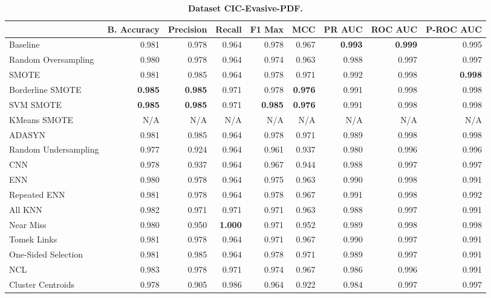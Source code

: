\begin{table}[H]
    \centering
    \setlength\tabcolsep{2pt}
    \begin{tabularx}{\textwidth}{lRRRRRRRR}
        & B. Accuracy & Precision & Recall & F1 Max & MCC & PR AUC & ROC AUC & P-ROC AUC \\
        \midrule
        Baseline & 0.981 & 0.978 & 0.964 & 0.978 & 0.967 & \textbf{0.993} & \textbf{0.999} & 0.995 \\
        Random Oversampling & 0.980 & 0.978 & 0.964 & 0.974 & 0.963 & 0.988 & 0.997 & 0.997 \\
        SMOTE & 0.981 & 0.985 & 0.964 & 0.978 & 0.971 & 0.992 & 0.998 & \textbf{0.998} \\
        Borderline SMOTE & \textbf{0.985} & \textbf{0.985} & 0.971 & 0.978 & \textbf{0.976} & 0.991 & 0.998 & 0.998 \\
        SVM SMOTE & \textbf{0.985} & \textbf{0.985} & 0.971 & \textbf{0.985} & \textbf{0.976} & 0.991 & 0.998 & 0.998 \\
        KMeans SMOTE & N/A & N/A & N/A & N/A & N/A & N/A & N/A & N/A \\
        ADASYN & 0.981 & 0.985 & 0.964 & 0.978 & 0.971 & 0.989 & 0.998 & 0.998 \\
        Random Undersampling & 0.977 & 0.924 & 0.964 & 0.961 & 0.937 & 0.980 & 0.996 & 0.996 \\
        CNN & 0.978 & 0.937 & 0.964 & 0.967 & 0.944 & 0.988 & 0.997 & 0.997 \\
        ENN & 0.980 & 0.978 & 0.964 & 0.975 & 0.963 & 0.990 & 0.998 & 0.991 \\
        Repeated ENN & 0.981 & 0.978 & 0.964 & 0.978 & 0.967 & 0.991 & 0.998 & 0.992 \\
        All KNN & 0.982 & 0.971 & 0.971 & 0.971 & 0.963 & 0.988 & 0.997 & 0.991 \\
        Near Miss & 0.980 & 0.950 & \textbf{1.000} & 0.971 & 0.952 & 0.989 & 0.998 & 0.998 \\
        Tomek Links & 0.981 & 0.978 & 0.964 & 0.971 & 0.967 & 0.990 & 0.997 & 0.991 \\
        One-Sided Selection & 0.981 & 0.985 & 0.964 & 0.978 & 0.971 & 0.989 & 0.997 & 0.991 \\
        NCL & 0.983 & 0.978 & 0.971 & 0.974 & 0.967 & 0.986 & 0.996 & 0.991 \\
        Cluster Centroids & 0.978 & 0.905 & 0.986 & 0.964 & 0.922 & 0.984 & 0.997 & 0.997 \\
    \end{tabularx}
    \vspace{1mm}
    \caption{\textbf{Dataset CIC-Evasive-PDF.}}
\end{table}
